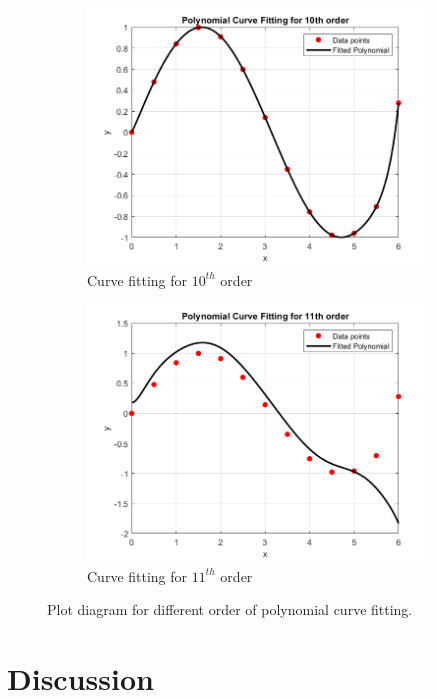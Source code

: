 \documentclass[a4paper,12pt]{article}
\begin{document}
\begin{figure}[H]
	\begin{subfigure}[t]{0.49\textwidth}
		\centering
		\includegraphics[width=1.1\linewidth]{Images/10}
	\caption{Curve fitting for $10^{th}$ order}
	\end{subfigure}
		\hfil
	\begin{subfigure}[t]{0.49\textwidth}
		\centering
		\includegraphics[width=1.1\linewidth]{Images/11}
		\caption{Curve fitting for $11^{th}$ order}
	\end{subfigure}
	\caption{Plot diagram for different order of polynomial curve fitting.}
\end{figure}
\newpage
	
	\section{Discussion}
\end{document}
